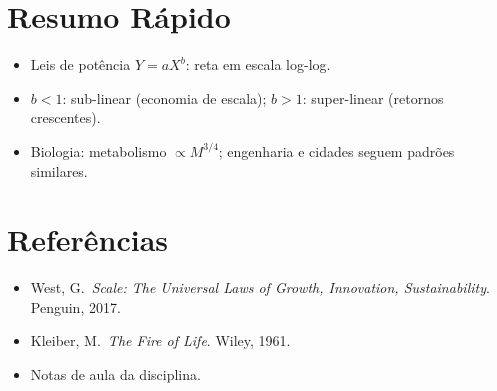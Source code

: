 \documentclass[12pt,a4paper]{article}
\begin{document}
\section*{Resumo R\'apido}
\begin{itemize}
  \item Leis de pot\^encia $Y = aX^b$: reta em escala log-log.
  \item $b < 1$: sub-linear (economia de escala); $b > 1$: super-linear (retornos crescentes).
  \item Biologia: metabolismo $\propto M^{3/4}$; engenharia e cidades seguem padr\~oes similares.
\end{itemize}

\section*{Refer\^encias}
\begin{itemize}
  \item West, G.\ \textit{Scale: The Universal Laws of Growth, Innovation, Sustainability}. Penguin, 2017.
  \item Kleiber, M.\ \textit{The Fire of Life}. Wiley, 1961.
  \item Notas de aula da disciplina.
\end{itemize}
\end{document}
